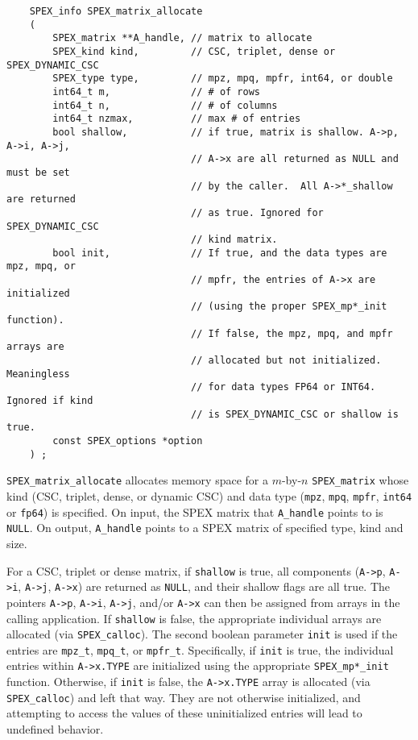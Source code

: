 \documentclass[12pt]{report}
\theoremstyle{definition}
\begin{document}
\begin{mdframed}[userdefinedwidth=6in]
{\footnotesize
\begin{verbatim}
    SPEX_info SPEX_matrix_allocate
    (
        SPEX_matrix **A_handle, // matrix to allocate
        SPEX_kind kind,         // CSC, triplet, dense or SPEX_DYNAMIC_CSC
        SPEX_type type,         // mpz, mpq, mpfr, int64, or double
        int64_t m,              // # of rows
        int64_t n,              // # of columns
        int64_t nzmax,          // max # of entries
        bool shallow,           // if true, matrix is shallow. A->p, A->i, A->j,
                                // A->x are all returned as NULL and must be set
                                // by the caller.  All A->*_shallow are returned
                                // as true. Ignored for SPEX_DYNAMIC_CSC
                                // kind matrix.
        bool init,              // If true, and the data types are mpz, mpq, or
                                // mpfr, the entries of A->x are initialized
                                // (using the proper SPEX_mp*_init function).
                                // If false, the mpz, mpq, and mpfr arrays are
                                // allocated but not initialized. Meaningless
                                // for data types FP64 or INT64. Ignored if kind
                                // is SPEX_DYNAMIC_CSC or shallow is true.
        const SPEX_options *option
    ) ;
\end{verbatim}
} \end{mdframed}

\verb|SPEX_matrix_allocate| allocates memory space for a $m$-by-$n$
\verb|SPEX_matrix| whose kind (CSC, triplet, dense, or dynamic CSC) and data type
(\verb|mpz|, \verb|mpq|, \verb|mpfr|, \verb|int64| or \verb|fp64|) is
specified. On input, the SPEX matrix that \verb|A_handle| points to is \verb|NULL|. 
On output, \verb|A_handle| points to a SPEX matrix of specified type, kind and size.

For a CSC, triplet or dense matrix, if \verb|shallow| is true, all components (\verb|A->p|, \verb|A->i|,
\verb|A->j|, \verb|A->x|) are returned as \verb|NULL|, and their shallow flags
are all true.  The pointers \verb|A->p|, \verb|A->i|, \verb|A->j|,
and/or \verb|A->x| can then be assigned from arrays in the calling application.
If \verb|shallow| is false, the appropriate individual arrays are allocated
(via \verb|SPEX_calloc|). The second boolean parameter \verb|init| is used if the entries
are \verb|mpz_t|, \verb|mpq_t|, or \verb|mpfr_t|. Specifically, if \verb|init|
is true, the individual entries within \verb|A->x.TYPE| are initialized using
the appropriate \verb|SPEX_mp*_init| function. Otherwise, if \verb|init| is
false, the \verb|A->x.TYPE| array is allocated (via \verb|SPEX_calloc|) and
left that way.  They are not otherwise initialized, and attempting to access
the values of these uninitialized entries will lead to undefined behavior.
\end{document}

